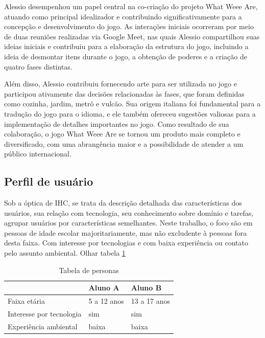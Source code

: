 Alessio desempenhou um papel central na co-criação do projeto What Weee Are, atuando como principal idealizador e contribuindo significativamente para a concepção e desenvolvimento do jogo. As interações iniciais ocorreram por meio de duas reuniões realizadas via Google Meet, nas quais Alessio compartilhou suas ideias iniciais e contribuiu para a elaboração da estrutura do jogo, incluindo a ideia de desmontar itens durante o jogo, a obtenção de poderes e a criação de quatro fases distintas.

Além disso, Alessio contribuiu fornecendo arte para ser utilizada no jogo e participou ativamente das decisões relacionadas às fases, que foram definidas como cozinha, jardim, metrô e vulcão. Sua origem italiana foi fundamental para a tradução do jogo para o idioma, e ele também ofereceu sugestões valiosas para a implementação de detalhes importantes no jogo. Como resultado de sua colaboração, o jogo What Weee Are se tornou um produto mais completo e diversificado, com uma abrangência maior e a possibilidade de atender a um público internacional.

\subsection{Perfil de usuário}
Sob a óptica de IHC, se trata da descrição detalhada das características dos usuários, sua relação com tecnologia, seu conhecimento sobre domínio e tarefas, agrupar usuários por características semelhantes. Neste trabalho, o foco são em pessoas de idade escolar majoritariamente, mas não excludente à pessoas fora desta faixa. Com interesse por tecnologias e com baixa experiência ou contato pelo assunto ambiental. Olhar tabela \ref{table:personasTable}
\begin{table}[h]
    \centering
    \begin{tabular}{|l|l|l|}
        \hline
                                 & Aluno A     & Aluno B      \\ \hline
        Faixa etária             & 5 a 12 anos & 13 a 17 anos \\ \hline
        Interesse por tecnologia & sim         & sim          \\ \hline
        Experiência ambiental    & baixa       & baixa        \\ \hline
    \end{tabular}
\caption{Tabela de personas}
\label{table:personasTable}
\end{table}

